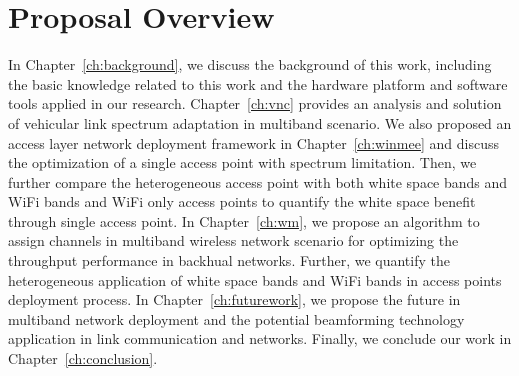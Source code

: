 

\section{Proposal Overview}

In Chapter~\ref{ch:background}, we discuss the background of this work, 
including the basic knowledge related to this work and the hardware 
platform and software tools applied in our research. Chapter~\ref{ch:vnc} 
provides an analysis and solution of vehicular link spectrum adaptation in 
multiband scenario. We also proposed an access layer network deployment 
framework in Chapter~\ref{ch:winmee} and discuss the optimization of a 
single access point with spectrum limitation. Then, we further
compare the heterogeneous access point with both white space bands and WiFi 
bands and WiFi only access points to quantify the white space benefit 
through single access point. In Chapter~\ref{ch:wm}, we propose an 
algorithm to assign channels in multiband wireless network scenario for 
optimizing the throughput performance in backhual networks. Further, we 
quantify the heterogeneous application of white space bands and WiFi bands 
in access points deployment process. In Chapter~\ref{ch:futurework}, we 
propose the future in multiband network deployment and the potential 
beamforming technology application in link communication and networks. 
Finally, we conclude our work in Chapter~\ref{ch:conclusion}.

